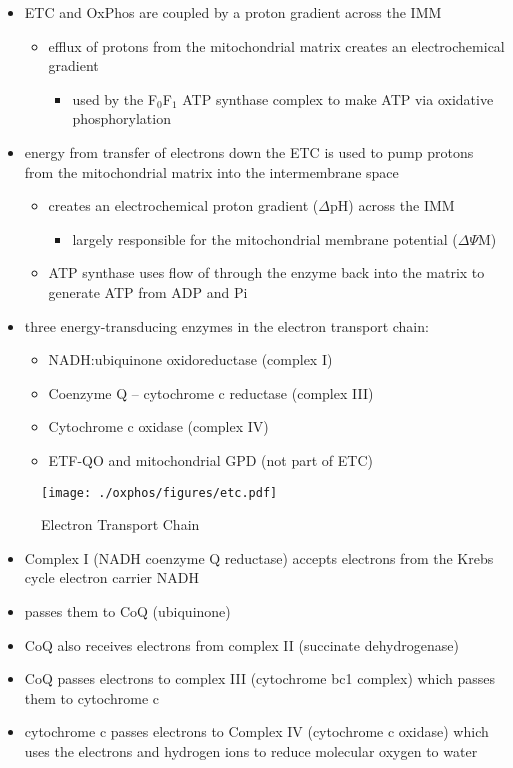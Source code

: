 \documentclass{scrartcl}
\begin{document}
\begin{itemize}
\item ETC and OxPhos are coupled by a proton gradient across the IMM
\begin{itemize}
\item efflux of protons from the mitochondrial matrix creates an
electrochemical gradient
\begin{itemize}
\item used by the F\(_{\text{0}}\)F\(_{\text{1}}\) ATP synthase complex to make ATP via oxidative phosphorylation
\end{itemize}
\end{itemize}
\item energy from transfer of electrons down the ETC is used to pump
protons from the mitochondrial matrix into the intermembrane space
\begin{itemize}
\item creates an electrochemical proton gradient (\(\Delta\)pH) across the IMM
\begin{itemize}
\item largely responsible for the mitochondrial membrane potential (\(\Delta \Psi\)M)
\end{itemize}
\item ATP synthase uses flow of  through the enzyme back into the
matrix to generate ATP from ADP and Pi
\end{itemize}
\item three energy-transducing enzymes in the electron transport chain:
\begin{itemize}
\item NADH:ubiquinone oxidoreductase (complex I)
\item Coenzyme Q – cytochrome c reductase (complex III)
\item Cytochrome c oxidase (complex IV)
\item ETF-QO and mitochondrial GPD (not part of ETC)
\end{itemize}
\end{itemize}

\begin{figure}[htbp]
\centering
\texttt{[image: ./oxphos/figures/etc.pdf]}
\caption{\label{fig:org053aa12}
Electron Transport Chain}
\end{figure}

\begin{itemize}
\item Complex I (NADH coenzyme Q reductase) accepts electrons from the
Krebs cycle electron carrier NADH
\item passes them to CoQ (ubiquinone)
\item CoQ also receives electrons from complex II (succinate dehydrogenase)
\item CoQ passes electrons to complex III (cytochrome bc1 complex) which
passes them to cytochrome c
\item cytochrome c passes electrons to Complex IV (cytochrome c oxidase)
which uses the electrons and hydrogen ions to reduce molecular
oxygen to water
\end{itemize}
\end{document}

